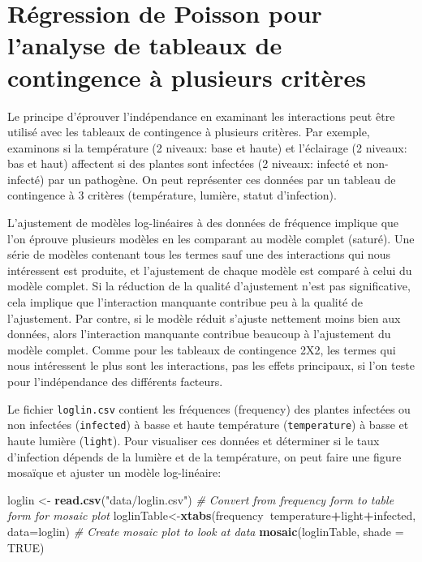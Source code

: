 \documentclass[12pt,]{book}
\newenvironment{Shaded}{\begin{snugshade}}{\end{snugshade}}
\newcommand{\CommentTok}[1]{\textcolor[rgb]{0.56,0.35,0.01}{\textit{#1}}}
\newcommand{\DataTypeTok}[1]{\textcolor[rgb]{0.13,0.29,0.53}{#1}}
\newcommand{\KeywordTok}[1]{\textcolor[rgb]{0.13,0.29,0.53}{\textbf{#1}}}
\newcommand{\NormalTok}[1]{#1}
\newcommand{\OperatorTok}[1]{\textcolor[rgb]{0.81,0.36,0.00}{\textbf{#1}}}
\newcommand{\OtherTok}[1]{\textcolor[rgb]{0.56,0.35,0.01}{#1}}
\newcommand{\StringTok}[1]{\textcolor[rgb]{0.31,0.60,0.02}{#1}}
\begin{document}
\hypertarget{ruxe9gression-de-poisson-pour-lanalyse-de-tableaux-de-contingence-uxe0-plusieurs-crituxe8res}{%
\section{Régression de Poisson pour l'analyse de tableaux de contingence à plusieurs critères}\label{ruxe9gression-de-poisson-pour-lanalyse-de-tableaux-de-contingence-uxe0-plusieurs-crituxe8res}}

Le principe d'éprouver l'indépendance en examinant les interactions peut être utilisé avec les tableaux de contingence à plusieurs critères. Par exemple, examinons si la température (2 niveaux: base et haute) et l'éclairage (2 niveaux: bas et haut) affectent si des plantes sont infectées (2 niveaux: infecté et non-infecté) par un pathogène. On peut représenter ces données par un tableau de contingence à 3 critères (température, lumière, statut d'infection).

L'ajustement de modèles log-linéaires à des données de fréquence implique que l'on éprouve plusieurs modèles en les comparant au modèle complet (saturé). Une série de modèles contenant tous les termes sauf une des interactions qui nous intéressent est produite, et l'ajustement de chaque modèle est comparé à celui du modèle complet. Si la réduction de la qualité d'ajustement n'est pas significative, cela implique que l'interaction manquante contribue peu à la qualité de l'ajustement. Par contre, si le modèle réduit s'ajuste nettement moins bien aux données, alors l'interaction manquante contribue beaucoup à l'ajustement du modèle complet. Comme pour les tableaux de contingence 2X2, les termes qui nous intéressent le plus sont les interactions, pas les effets principaux, si l'on teste pour l'indépendance des différents facteurs.

Le fichier \texttt{loglin.csv} contient les fréquences (frequency) des plantes infectées ou non infectées (\texttt{infected}) à basse et haute température (\texttt{temperature}) à basse et haute lumière (\texttt{light}). Pour visualiser ces données et déterminer si le taux d'infection dépends de la lumière et de la température, on peut faire une figure mosaïque et ajuster un modèle log-linéaire:

\begin{Shaded}
\begin{Highlighting}[]
\NormalTok{loglin <-}\StringTok{ }\KeywordTok{read.csv}\NormalTok{(}\StringTok{"data/loglin.csv"}\NormalTok{)}
\CommentTok{# Convert from frequency form to table form for mosaic plot}
\NormalTok{loglinTable<-}\KeywordTok{xtabs}\NormalTok{(frequency}\OperatorTok{~}\NormalTok{temperature}\OperatorTok{+}\NormalTok{light}\OperatorTok{+}\NormalTok{infected, }\DataTypeTok{data=}\NormalTok{loglin)}
\CommentTok{# Create mosaic plot to look at data}
\KeywordTok{mosaic}\NormalTok{(loglinTable, }\DataTypeTok{shade =} \OtherTok{TRUE}\NormalTok{)}
\end{Highlighting}
\end{Shaded}
\end{document}
